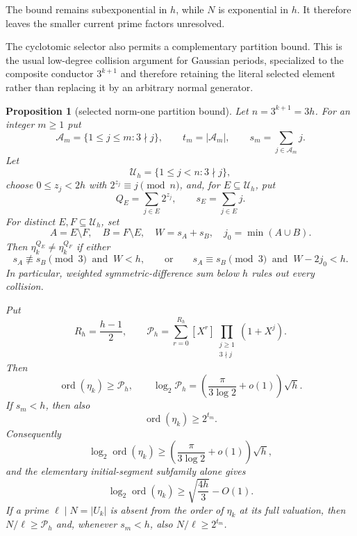 \documentclass[11pt]{article}
\newtheorem{proposition}[theorem]{Proposition}
\theoremstyle{definition}
\theoremstyle{remark}
\begin{document}
The bound remains subexponential in $h$, while $N$ is exponential in $h$.
It therefore leaves the smaller current prime factors unresolved.

The cyclotomic selector also permits a complementary partition bound.  This
is the usual low-degree collision argument for Gaussian periods, specialized
to the composite conductor $3^{k+1}$ and therefore retaining the literal
selected element rather than replacing it by an arbitrary normal generator.

\begin{proposition}[selected norm-one partition bound]
\label{prop:c-partition}
Let $n=3^{k+1}=3h$.  For an integer $m\geq1$ put
\[
 \mathcal A_m=\{1\leq j\leq m:3\nmid j\},\qquad
 t_m=|\mathcal A_m|,\qquad s_m=\sum_{j\in\mathcal A_m}j.
\]
Let
\[
 \mathcal U_h=\{1\leq j<n:3\nmid j\},
\]
choose $0\leq z_j<2h$ with $2^{z_j}\equiv j\pmod n$, and, for
$E\subseteq\mathcal U_h$, put
\[
 Q_E=\sum_{j\in E}2^{z_j},\qquad s_E=\sum_{j\in E}j.
\]
For distinct $E,F\subseteq\mathcal U_h$, set
\[
 A=E\setminus F,\quad B=F\setminus E,\quad
 W=s_A+s_B,\quad j_0=\min(A\cup B).
\]
Then $\eta_k^{Q_E}\ne\eta_k^{Q_F}$ if either
\[
 s_A\not\equiv s_B\pmod3\ \text{ and }\ W<h,
 \qquad\text{or}\qquad
 s_A\equiv s_B\pmod3\ \text{ and }\ W-2j_0<h.
\]
In particular, weighted symmetric-difference sum below $h$ rules out every
collision.

Put
\[
 R_h=\frac{h-1}{2},\qquad
 \mathcal P_h=
 \sum_{r=0}^{R_h}[X^r]
 \prod_{\substack{j\geq1\\3\nmid j}}(1+X^j).
\]
Then
\[
 \operatorname{ord}(\eta_k)\geq\mathcal P_h,
 \qquad
 \log_2\mathcal P_h=
 \left(\frac{\pi}{3\log 2}+o(1)\right)\sqrt h.
\]
If $s_m<h$, then also
\[
 \operatorname{ord}(\eta_k)\geq2^{t_m}.
\]
Consequently
\[
 \log_2\operatorname{ord}(\eta_k)
 \geq \left(\frac{\pi}{3\log 2}+o(1)\right)\sqrt h,
\]
and the elementary initial-segment subfamily alone gives
\[
 \log_2\operatorname{ord}(\eta_k)
 \geq \sqrt{\frac{4h}{3}}-O(1).
\]
If a prime $\ell\mid N=|U_k|$ is absent from the order of $\eta_k$ at its
full valuation, then $N/\ell\geq\mathcal P_h$ and, whenever $s_m<h$, also
$N/\ell\geq2^{t_m}$.
\end{proposition}
\end{document}
